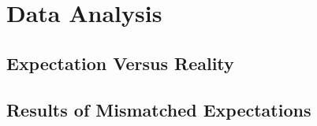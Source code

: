 \chapter{Data Analysis}
\section{Expectation Versus Reality}
\section{Results of Mismatched Expectations}
